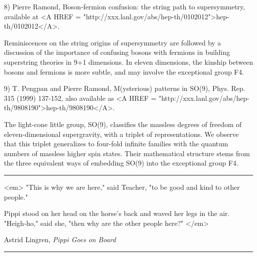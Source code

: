 8) Pierre Ramond, Boson-fermion confusion: the string path to
supersymmetry, available at <A HREF = "http://xxx.lanl.gov/abs/hep-th/0102012">hep-th/0102012</A>.

Reminiscences on the string origins of supersymmetry are followed by a
discussion of the importance of confusing bosons with fermions in
building superstring theories in 9+1 dimensions. In eleven dimensions,
the kinship between bosons and fermions is more subtle, and may
involve the exceptional group F4.

9) T. Pengpan and Pierre Ramond, M(ysterious) patterns in SO(9),
Phys. Rep. 315 (1999) 137-152, also available as <A HREF = "http://xxx.lanl.gov/abs/hep-th/9808190">hep-th/9808190</A>.

The light-cone little group, SO(9), classifies the massless degrees of
freedom of eleven-dimensional supergravity, with a triplet of
representations. We observe that this triplet generalizes to four-fold
infinite families with the quantum numbers of massless higher spin
states. Their mathematical structure stems from the three equivalent
ways of embedding SO(9) into the exceptional group F4.


\par\noindent\rule{\textwidth}{0.4pt}
<em>
"This is why we are here," said Teacher, "to be good
and kind to other people."

Pippi stood on her head on the horse's back and waved her legs in the
air.  "Heigh-ho," said she, "then why are the other
people here?" </em> 

Astrid Lingren, \emph{Pippi Goes on Board}

\par\noindent\rule{\textwidth}{0.4pt}

